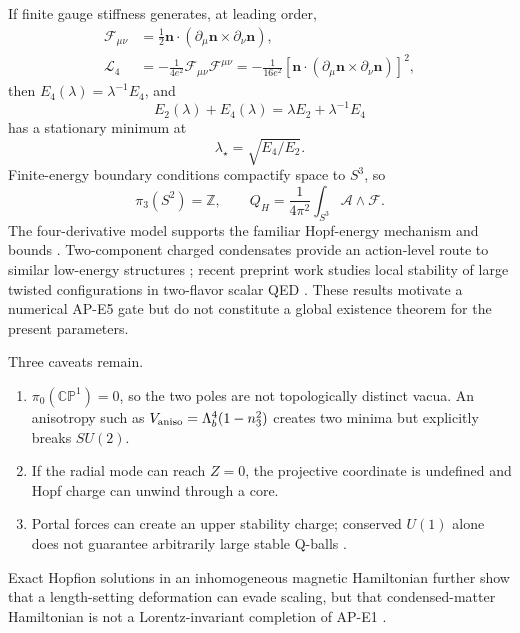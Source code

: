 \documentclass[11pt]{article}
\numberwithin{equation}{section}
\newcommand{\CP}{\mathbb{CP}}
\newcommand{\ZZ}{\mathbb Z}
\begin{document}
If finite gauge stiffness generates, at leading order,
\begin{align}
 \mathcal F_{\mu\nu}
 &=\frac12\bm n\cdot
 (\partial_\mu\bm n\times\partial_\nu\bm n),
 \label{eq:Fhopf}\\
 \mathcal L_4
 &=-\frac{1}{4e^2}\mathcal F_{\mu\nu}\mathcal F^{\mu\nu}
 =-\frac{1}{16e^2}
 [\bm n\cdot(\partial_\mu\bm n\times\partial_\nu\bm n)]^2,
 \label{eq:skyrme}
\end{align}
then \(E_4(\lambda)=\lambda^{-1}E_4\), and
\begin{equation}
 E_2(\lambda)+E_4(\lambda)
 =\lambda E_2+\lambda^{-1}E_4
\end{equation}
has a stationary minimum at
\begin{equation}
 \lambda_\star=\sqrt{E_4/E_2}.
 \label{eq:balance}
\end{equation}
Finite-energy boundary conditions compactify space to \(S^3\), so
\begin{equation}
 \pi_3(S^2)=\ZZ,
 \qquad
 Q_H=\frac{1}{4\pi^2}\int_{S^3}\mathcal A\wedge\mathcal F.
 \label{eq:hopfcharge}
\end{equation}
The four-derivative model supports the familiar Hopf-energy mechanism and
bounds \cite{VakulenkoKapitanskii1979,FaddeevNiemi1997}.  Two-component
charged condensates provide an action-level route to similar low-energy
structures \cite{BabaevFaddeevNiemi2002}; recent preprint work studies local
stability of large twisted configurations in two-flavor scalar QED
\cite{SheuShifman2026}.  These results motivate a numerical AP-E5 gate but do
not constitute a global existence theorem for the present parameters.

Three caveats remain.
\begin{enumerate}
\item \(\pi_0(\CP^1)=0\), so the two poles are not topologically distinct
vacua.  An anisotropy such as
\(V_{\rm aniso}=\Lambda_b^4(1-n_3^2)\) creates two minima but explicitly
breaks \(SU(2)\).
\item If the radial mode can reach \(Z=0\), the projective coordinate is
undefined and Hopf charge can unwind through a core.
\item Portal forces can create an upper stability charge; conserved \(U(1)\)
alone does not guarantee arbitrarily large stable Q-balls
\cite{HamadaEtAl2024APE1}.
\end{enumerate}
Exact Hopfion solutions in an inhomogeneous magnetic Hamiltonian further show
that a length-setting deformation can evade scaling, but that condensed-matter
Hamiltonian is not a Lorentz-invariant completion of AP-E1
\cite{BalakrishnanEtAl2023}.
\end{document}

